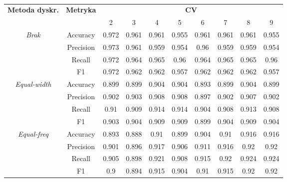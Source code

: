 \begin{table}[H]
\center
    \caption{}
    \begin{tabular}{|c|c|c|c|c|c|c|c|c|c|}
        \hline
        \multirow{2}{*}{\textbf{Metoda dyskr.}} & \multirow{2}{*}{\textbf{Metryka}} & \multicolumn{8}{|c|}{\textbf{CV}} \\ \cline{3-10}
                        &  & 2 & 3 & 4 & 5 & 6 & 7 & 8 & 9 \\ \hline
        \multirow{4}{*}{\textit{Brak}}  & Accuracy & 0.972 & 0.961 & 0.961 & 0.955 & 0.961 & 0.961 & 0.961 & 0.955 \\ \cline{2-10}
                                     & Precision & 0.973 & 0.961 & 0.959 & 0.954 & 0.96 & 0.959 & 0.959 & 0.954 \\ \cline{2-10}
                                     & Recall & 0.972 & 0.964 & 0.965 & 0.96 & 0.964 & 0.965 & 0.965 & 0.96 \\ \cline{2-10}
                                     & F1 & 0.972 & 0.962 & 0.962 & 0.957 & 0.962 & 0.962 & 0.962 & 0.957 \\ \cline{2-10}


        \multirow{4}{*}{\textit{Equal-width}}  & Accuracy & 0.899 & 0.899 & 0.904 & 0.904 & 0.893 & 0.899 & 0.904 & 0.899 \\ \cline{2-10}
                                             & Precision & 0.902 & 0.903 & 0.908 & 0.908 & 0.897 & 0.902 & 0.907 & 0.902 \\ \cline{2-10}
                                             & Recall & 0.91 & 0.909 & 0.914 & 0.914 & 0.904 & 0.908 & 0.913 & 0.908 \\ \cline{2-10}
                                             & F1 & 0.903 & 0.904 & 0.909 & 0.909 & 0.899 & 0.904 & 0.909 & 0.904 \\ \cline{2-10}


        \multirow{4}{*}{\textit{Equal-freq}}  & Accuracy & 0.893 & 0.888 & 0.91 & 0.899 & 0.904 & 0.91 & 0.916 & 0.916 \\ \cline{2-10}
                                             & Precision & 0.901 & 0.896 & 0.917 & 0.906 & 0.911 & 0.916 & 0.92 & 0.92 \\ \cline{2-10}
                                             & Recall & 0.905 & 0.898 & 0.921 & 0.908 & 0.915 & 0.92 & 0.924 & 0.924 \\ \cline{2-10}
                                             & F1 & 0.9 & 0.894 & 0.915 & 0.904 & 0.91 & 0.915 & 0.92 & 0.92 \\ \cline{2-10}



\end{tabular}
\end{table}

